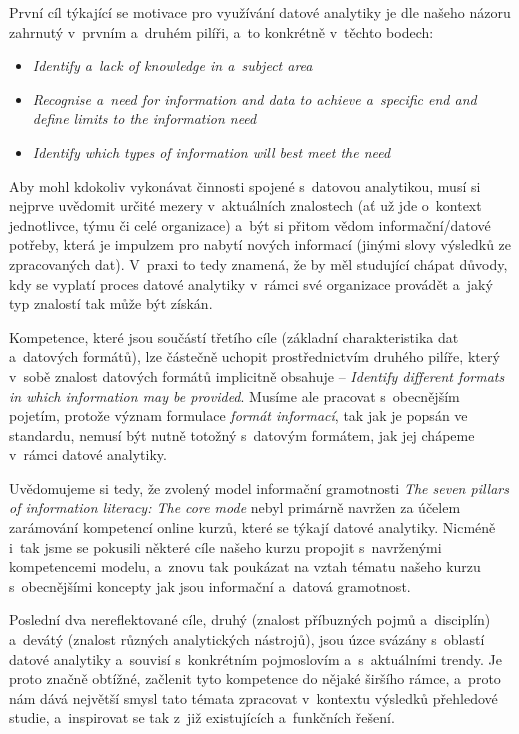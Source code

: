 První cíl týkající se motivace pro využívání datové analytiky je dle našeho názoru zahrnutý v~prvním a~druhém pilíři, a~to konkrétně v~těchto bodech:

\begin{itemize}
\tightlist
\item
  \emph{Identify a~lack of knowledge in a~subject area}
\item
  \emph{Recognise a~need for information and data to achieve a~specific end and define limits to the information need}
\item
  \emph{Identify which types of information will best meet the need}
\end{itemize}

Aby mohl kdokoliv vykonávat činnosti spojené s~datovou analytikou, musí si nejprve uvědomit určité mezery v~aktuálních znalostech (ať už jde o~kontext jednotlivce, týmu či celé organizace) a~být si přitom vědom informační/datové potřeby, která je impulzem pro nabytí nových informací (jinými slovy výsledků ze zpracovaných dat). V~praxi to tedy znamená, že by měl studující chápat důvody, kdy se vyplatí proces datové analytiky v~rámci své organizace provádět a~jaký typ znalostí tak může být získán.

Kompetence, které jsou součástí třetího cíle (základní charakteristika dat a~datových formátů), lze částečně uchopit prostřednictvím druhého pilíře, který v~sobě znalost datových formátů implicitně obsahuje -- \emph{Identify different formats in which information may be provided}. Musíme ale pracovat s~obecnějším pojetím, protože význam formulace \emph{formát informací}, tak jak je popsán ve standardu, nemusí být nutně totožný s~datovým formátem, jak jej chápeme v~rámci datové analytiky.

Uvědomujeme si tedy, že zvolený model informační gramotnosti \emph{The seven pillars of information literacy: The core mode} nebyl primárně navržen za účelem zarámování kompetencí online kurzů, které se týkají datové analytiky. Nicméně i~tak jsme se pokusili některé cíle našeho kurzu propojit s~navrženými kompetencemi modelu, a~znovu tak poukázat na vztah tématu našeho kurzu s~obecnějšími koncepty jak jsou informační a~datová gramotnost.

Poslední dva nereflektované cíle, druhý (znalost příbuzných pojmů a~disciplín) a~devátý (znalost různých analytických nástrojů), jsou úzce svázány s~oblastí datové analytiky a~souvisí s~konkrétním pojmoslovím a~s~aktuálními trendy. Je proto značně obtížné, začlenit tyto kompetence do nějaké širšího rámce, a~proto nám dává největší smysl tato témata zpracovat v~kontextu výsledků přehledové studie, a~inspirovat se tak z~již existujících a~funkčních řešení.
